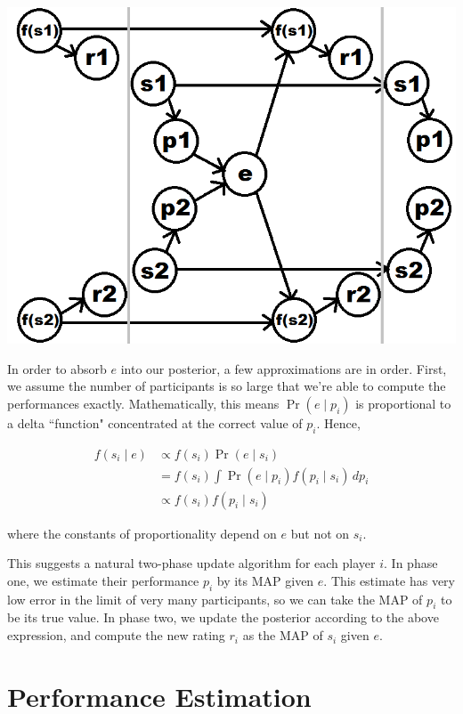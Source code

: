 \documentclass{article}
\begin{document}
\begin{center} \includegraphics[scale=0.35]{../images/HMMlabeled.png} \end{center}

In order to absorb $e$ into our posterior, a few approximations are in order. First, we assume the number of participants is so large that we're able to compute the performances exactly. Mathematically, this means $\Pr(e \mid p_i)$ is proportional to a delta ``function" concentrated at the correct value of $p_i$. Hence,

\begin{align*}
f(s_i\mid e)
&\propto f(s_i)\Pr(e\mid s_i)
\\&= f(s_i)\int \Pr(e\mid p_i)f(p_i\mid s_i)\,dp_i
\\&\propto f(s_i)f(p_i\mid s_i)
\end{align*}

where the constants of proportionality depend on $e$ but not on $s_i$.

This suggests a natural two-phase update algorithm for each player $i$. In phase one, we estimate their performance $p_i$ by its MAP given $e$. This estimate has very low error in the limit of very many participants, so we can take the MAP of $p_i$ to be its true value. In phase two, we update the posterior according to the above expression, and compute the new rating $r_i$ as the MAP of $s_i$ given $e$.

\section{Performance Estimation}
\end{document}
